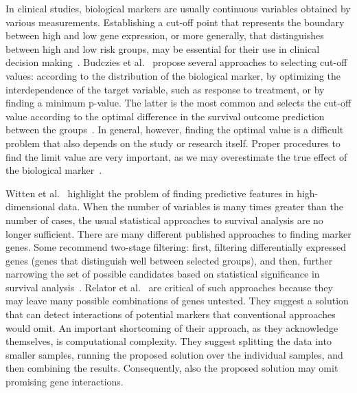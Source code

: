 \documentclass[11pt,a4paper]{article}
\begin{document}
In clinical studies, biological markers are usually continuous variables obtained by various measurements. Establishing a cut-off point that represents the boundary between high and low gene expression, or more generally, that distinguishes between high and low risk groups, may be essential for their use in clinical decision making~\cite{mazumdar2000categorizing}. Budczies et al.~\cite{budczies2012cutoff} propose several approaches to selecting cut-off values: according to the distribution of the biological marker, by optimizing the interdependence of the target variable, such as response to treatment, or by finding a minimum p-value. The latter is the most common and selects the cut-off value according to the optimal difference in the survival outcome prediction between the groups~\cite{woo2020determination}. In general, however, finding the optimal value is a difficult problem that also depends on the study or research itself. Proper procedures to find the limit value are very important, as we may overestimate the true effect of the biological marker~\cite{Altman1991}.

Witten et al.~\cite{witten2010survival} highlight the problem of finding predictive features in high-dimensional data. When the number of variables is many times greater than the number of cases, the usual statistical approaches to survival analysis are no longer sufficient. There are many different published approaches to finding marker genes. Some recommend two-stage filtering: first, filtering differentially expressed genes (genes that distinguish well between selected groups), and then, further narrowing the set of possible candidates based on statistical significance in survival analysis~\cite{wang2017identification,liao2018identification,zhang2011discovery,kim2013identification}. Relator et al.~\cite{relator2018identifying} are critical of such approaches because they may leave many possible combinations of genes untested. They suggest a solution that can detect interactions of potential markers that conventional approaches would omit. An important shortcoming of their approach, as they acknowledge themselves, is computational complexity. They suggest splitting the data into smaller samples, running the proposed solution over the individual samples, and then combining the results. Consequently, also the proposed solution may omit promising gene interactions.
\end{document}
